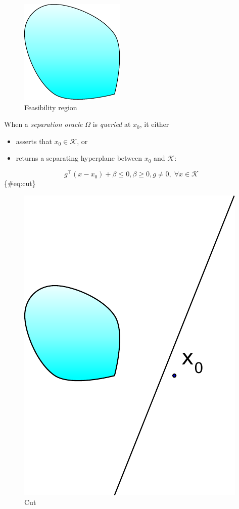 \documentclass[]{article}
\providecommand{\tightlist}{%
  \setlength{\itemsep}{0pt}\setlength{\parskip}{0pt}}
\begin{document}
\begin{figure}
\hypertarget{fig:region}{%
\centering
\includegraphics{ellipsoid.files/region.pdf}
\caption{Feasibility region}\label{fig:region}
}
\end{figure}

When a \emph{separation oracle} \(\Omega\) is \emph{queried} at \(x_0\),
it either

\begin{itemize}
\tightlist
\item
  asserts that \(x_0 \in \mathcal{K}\), or
\item
  returns a separating hyperplane between \(x_0\) and \(\mathcal{K}\):
\end{itemize}

\[g^\top (x - x_0) + \beta \leq 0, \beta \geq 0, g \neq 0, \; \forall x \in \mathcal{K}\]
\{\#eq:cut\}

\begin{figure}
\hypertarget{fig:cut}{%
\centering
\includegraphics{ellipsoid.files/cut.pdf}
\caption{Cut}\label{fig:cut}
}
\end{figure}
\end{document}
